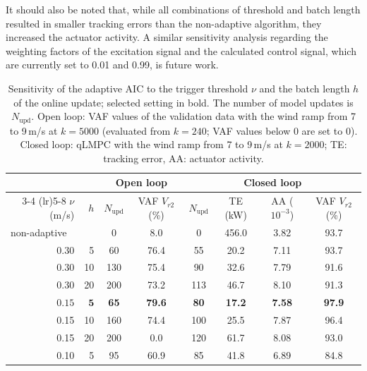 It should also be noted that, while all combinations of threshold and batch length resulted in smaller tracking errors than the non-adaptive algorithm, they increased the actuator activity. A similar sensitivity analysis regarding the weighting factors of the excitation signal and the calculated control signal, which are currently set to 0.01 and 0.99, is future work.

\begin{table}[htbp]
    \centering
    \caption[Sensitivity of the adaptive AIC to the update settings]{Sensitivity of the adaptive AIC to the trigger threshold $\nu$ and the batch length $h$ of the online update; selected setting in bold. The number of model updates is $N_\text{upd}$. Open loop: VAF values of the validation data with the wind ramp from 7 to 9\,m/s at $k = 5000$ (evaluated from $k = 240$; VAF values below 0 are set to 0). Closed loop: qLMPC with the wind ramp from 7 to 9\,m/s at $k = 2000$; TE: tracking error, AA: actuator activity.}
    \label{tab:sensitivityAdaptiveAIC}
    \begin{tabular}{rr cc cccc}
        \toprule
        & & \multicolumn{2}{c}{Open loop} & \multicolumn{4}{c}{Closed loop} \\
        \cmidrule(lr){3-4} \cmidrule(lr){5-8}
        $\nu$ (m/s) & $h$ & $N_\text{upd}$ & VAF $V_{r2}$ (\%) & $N_\text{upd}$ & TE (kW) & AA ($10^{-3}$) & VAF $V_{r2}$ (\%) \\
        \midrule
        \multicolumn{2}{l}{non-adaptive} & 0 & 8.0 & 0 & 456.0 & 3.82 & 93.7 \\
        \midrule
        0.30 & 5 & 60 & 76.4 & 55 & 20.2 & 7.11 & 93.7 \\
        0.30 & 10 & 130 & 75.4 & 90 & 32.6 & 7.79 & 91.6 \\
        0.30 & 20 & 200 & 73.2 & 113 & 46.7 & 8.10 & 91.3 \\
        \midrule
        $\bm{0.15}$ & $\bm{5}$ & \textbf{65} & \textbf{79.6} & \textbf{80} & \textbf{17.2} & \textbf{7.58} & \textbf{97.9} \\
        0.15 & 10 & 160 & 74.4 & 100 & 25.5 & 7.87 & 96.4 \\
        0.15 & 20 & 200 & 0.0 & 120 & 61.7 & 8.08 & 93.0 \\
        \midrule
        0.10 & 5 & 95 & 60.9 & 85 & 41.8 & 6.89 & 84.8 \\

\end{tabular}
\end{table}
